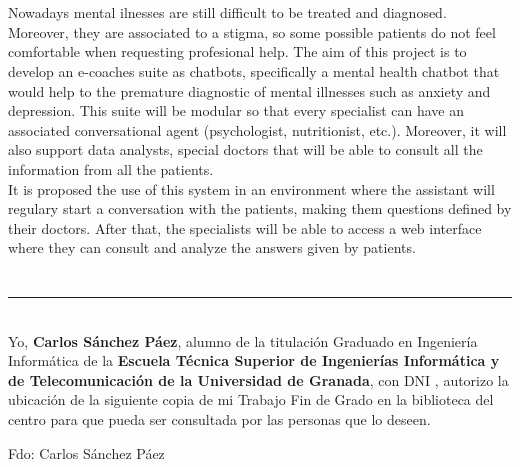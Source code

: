 \\

\vspace{0.7cm}
\\

Nowadays mental ilnesses are still difficult to be treated and diagnosed. Moreover, they are associated to a stigma, so some possible patients do not feel comfortable when requesting profesional help. The aim of this project is to develop an e-coaches suite as chatbots, specifically a mental health chatbot
that would help to the premature diagnostic of mental illnesses such as anxiety and depression. This suite will be modular so that every specialist can have an associated conversational agent (psychologist, nutritionist, etc.). Moreover, it will also support data analysts, special doctors that will be able to consult all the information from all the patients.\\

It is proposed the use of this system in an environment where the assistant will regulary start a conversation with the patients, making them questions defined by their doctors. After that, the specialists will be able to access a web interface where they can consult and analyze the answers given by patients.

\newpage

\section*{}
\thispagestyle{empty}

\noindent\rule[-1ex]{\textwidth}{2pt}\\[4.5ex]

Yo, \textbf{Carlos Sánchez Páez}, alumno de la titulación Graduado en Ingeniería Informática de la \textbf{Escuela Técnica Superior
de Ingenierías Informática y de Telecomunicación de la Universidad de Granada}, con DNI , autorizo la
ubicación de la siguiente copia de mi Trabajo Fin de Grado en la biblioteca del centro para que pueda ser
consultada por las personas que lo deseen.

\vspace{6cm}

\begin{center}
  Fdo: Carlos Sánchez Páez

\end{center}

